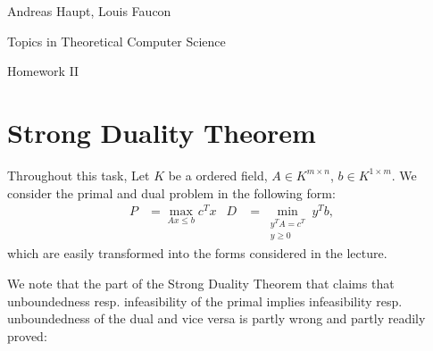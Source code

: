 \documentclass{scrartcl}
\newcommand\1{\mathbf{1}}
\begin{document}
Andreas Haupt, Louis Faucon

Topics in Theoretical Computer Science 

Homework II
\section{Strong Duality Theorem}
Throughout this task, Let $K$ be a ordered field, $A \in K^{m\times n}$, $b \in K^{1 \times m}$. We consider the primal and dual problem in the following form: 
\begin{align*}
P &= \max_{Ax \le b} c^T x & D &= \min_{\substack{y^T A = c^T\\y \ge 0}} y^T b,
\end{align*}
which are easily transformed into the forms considered in the lecture.

We note that the part of the Strong Duality Theorem that claims that unboundedness resp. infeasibility of the primal implies infeasibility resp. unboundedness of the dual and vice versa is partly wrong and partly readily proved: 
\end{document}

